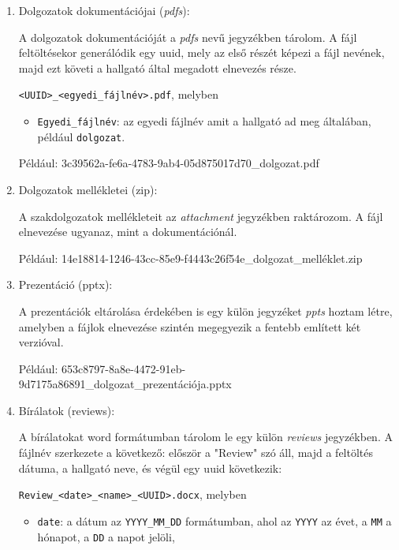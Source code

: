\begin{enumerate}

\item{Dolgozatok dokumentációjai (\textit{pdfs}):}

A dolgozatok dokumentációját a \textit{pdfs} nevű jegyzékben tárolom. 
A fájl feltöltésekor generálódik egy uuid, mely az első részét képezi a fájl nevének, majd ezt követi a hallgató által megadott elnevezés része.

\texttt{<UUID>\_<egyedi\_fájlnév>.pdf}, melyben

\begin{itemize}

\item\texttt{Egyedi\_fájlnév}: az egyedi fájlnév amit a hallgató ad meg általában, például \texttt{dolgozat}.

\end{itemize}

Például: 3c39562a-fe6a-4783-9ab4-05d875017d70\_dolgozat.pdf


\item{Dolgozatok mellékletei (zip):}

A szakdolgozatok mellékleteit az \textit{attachment} jegyzékben raktározom. A fájl elnevezése ugyanaz, mint a dokumentációnál.

Például: 14e18814-1246-43cc-85e9-f4443c26f54e\_dolgozat\_melléklet.zip

\item{Prezentáció (pptx):}

A prezentációk eltárolása érdekében is egy külön jegyzéket \textit{ppts} hoztam létre, amelyben a fájlok elnevezése szintén megegyezik a fentebb említett két verzióval.

Például: 653c8797-8a8e-4472-91eb-9d7175a86891\_dolgozat\_prezentációja.pptx

\item{Bírálatok (reviews):}

A bírálatokat word formátumban tárolom le egy külön \textit{reviews} jegyzékben. A fájlnév szerkezete a következő: először a "Review" szó áll, majd a feltöltés dátuma, a hallgató neve, és végül egy uuid következik:

\texttt{Review\_<date>\_<name>\_<UUID>.docx}, melyben

\begin{itemize}
\item \texttt{date}: a dátum az \texttt{YYYY\_MM\_DD} formátumban, ahol az \texttt{YYYY} az évet, a \texttt{MM} a hónapot, a \texttt{DD} a napot jelöli,


\end{itemize}
\end{enumerate}
